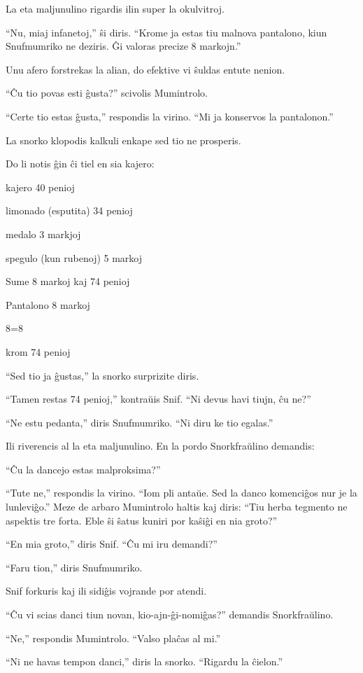 La eta maljunulino rigardis ilin super la okulvitroj.

``Nu, miaj infanetoj,'' ŝi diris. ``Krome ja estas tiu malnova pantalono, kiun Snufmumriko ne deziris. Ĝi valoras precize 8 markojn.''

Unu afero forstrekas la alian, do efektive vi ŝuldas entute nenion.

``Ĉu tio povas esti ĝusta?'' scivolis Mumintrolo.

``Certe tio estas ĝusta,'' respondis la virino. ``Mi ja konservos la pantalonon.''

La snorko klopodis kalkuli enkape sed tio ne prosperis.

Do li notis ĝin ĉi tiel en sia kajero:

kajero	40 penioj

limonado (esputita)	34 penioj

medalo	3 markjoj

spegulo (kun rubenoj)	5 markoj

Sume 8 markoj kaj 74 penioj

Pantalono 8 markoj

8=8

krom 74 penioj

``Sed tio ja ĝustas,'' la snorko surprizite diris.

``Tamen restas 74 penioj,'' kontraŭis Snif. ``Ni devus havi tiujn, ĉu ne?''

``Ne estu pedanta,'' diris Snufmumriko. ``Ni diru ke tio egalas.''

Ili riverencis al la eta maljunulino. En la pordo Snorkfraŭlino demandis:

``Ĉu la dancejo estas malproksima?''

``Tute ne,'' respondis la virino. ``Iom pli antaŭe. Sed la danco komenciĝos nur je la lunleviĝo.''
\sectionbreak
Meze de arbaro Mumintrolo haltis kaj diris: ``Tiu herba tegmento ne aspektis tre forta. Eble ŝi ŝatus kuniri por kaŝiĝi en nia groto?''

``En mia groto,'' diris Snif. ``Ĉu mi iru demandi?''

``Faru tion,'' diris Snufmumriko.

Snif forkuris kaj ili sidiĝis vojrande por atendi.

``Ĉu vi scias danci tiun novan, kio-ajn-ĝi-nomiĝas?'' demandis Snorkfraŭlino.

``Ne,'' respondis Mumintrolo. ``Valso plaĉas al mi.''

``Ni ne havas tempon danci,'' diris la snorko. ``Rigardu la ĉielon.''

